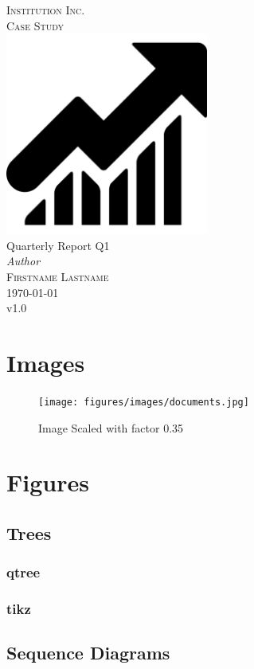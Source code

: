 \documentclass[a4paper, 12pt]{report}
\newcommand{\varDocTitle}{Quarterly Report Q1}
\newcommand{\varDocAuthor}{Firstname Lastname}
\newcommand{\varInstitution}{Institution Inc.}
\newcommand{\varReportType}{Case Study}
\begin{document}
    \begin{titlepage}
        \newcommand{\HRule}{\rule{\linewidth}{0.3mm}}
        \center
        \textsc{\large \varInstitution}\\[1.5cm]
        \textsc{\large \varReportType}\\[1.5cm]
        \includegraphics[width=0.5\textwidth]{figures/images/logo.png}\\[1.5cm]
        {\huge \varDocTitle }\\[2cm]
        {\large\textit{Author}}\\
        \textsc{\varDocAuthor}\\[1cm]
        {\large\today\\v1.0}
    \end{titlepage}

    \tableofcontents

    \chapter{Images}

    \begin{figure}[!htb]
        \centering
        \texttt{[image: figures/images/documents.jpg]}
        \caption{Image Scaled with factor 0.35}
        \label{fig:mobileid-architecture}
    \end{figure}

    \chapter{Figures}

    \section{Trees}

    \subsection{qtree}
    
    \newpage

    \subsection{tikz}
    
    \newpage

    \section{Sequence Diagrams}
    
    \newpage
    
\end{document}
